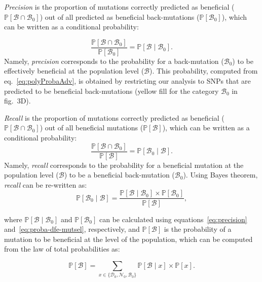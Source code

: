 \documentclass[12pt]{article}
\newcommand{\proba}{\mathbb{P}}
\newcommand{\SphyDel}{\mathcal{D}_0}
\newcommand{\SphyNeu}{\mathcal{N}_0}
\newcommand{\SphyBen}{\mathcal{B}_0}
\newcommand{\Sphyclass}{x}
\newcommand{\given}{\mid}
\newcommand{\SpopBen}{\mathcal{B}}
\newcommand{\ProbaPopBen}{\proba [ \SpopBen ]}
\begin{document}
    \textit{Precision} is the proportion of mutations correctly predicted as beneficial ($\proba [ \SpopBen \cap  \SphyBen]$) out of all predicted as beneficial back-mutations ($\proba [ \SphyBen]$), which can be written as a conditional probability:

    \begin{equation}
        \frac{\proba [ \SpopBen  \cap  \SphyBen]}{\proba [ \SphyBen]} = \proba [ \SpopBen  \given  \SphyBen].
        \label{eq:precision}
    \end{equation}
    Namely, \textit{precision} corresponds to the probability for a back-mutation ($\SphyBen$) to be effectively beneficial at the population level ($\SpopBen$).
    This probability, computed from eq.~\ref{eq:polyProbaAdv}, is obtained by restricting our analysis to SNPs that are predicted to be beneficial back-mutations (yellow fill for the category $\SphyBen$ in fig.~3D).

    \textit{Recall} is the proportion of mutations correctly predicted as beneficial ($\proba [ \SpopBen \cap  \SphyBen]$) out of all beneficial mutations ($\proba [ \SpopBen]$), which can be written as a conditional probability:
    \begin{equation}
        \frac{\proba [ \SpopBen \cap  \SphyBen]}{\proba [ \SpopBen]} = \proba [ \SphyBen  \given \SpopBen ].
    \end{equation}
    Namely, \textit{recall} corresponds to the probability for a beneficial mutation at the population level ($\SpopBen$) to be a beneficial back-mutation ($\SphyBen$).
    Using Bayes theorem, \textit{recall} can be re-written as:
    \begin{equation}
        \proba [\SphyBen \given \SpopBen] = \frac{\proba [\SpopBen \given \SphyBen] \times \proba[\SphyBen]}{\ProbaPopBen},
        \label{eq:bayes}
    \end{equation}

    where $\proba [\SpopBen \given \SphyBen]$ and $\proba [ \SphyBen ]$ can be calculated using equations~\ref{eq:precision} and~\ref{eq:proba-dfe-mutsel}, respectively, and $\proba [ \SpopBen ]$ is the probability of a mutation to be beneficial at the level of the population, which can be computed from the law of total probabilities as:

    \begin{equation}
        \proba [ \SpopBen ] = \sum_{\Sphyclass \in \{\SphyDel, \SphyNeu, \SphyBen \} }\proba [\SpopBen \given \Sphyclass ] \times \proba [\Sphyclass ].
        \label{eq:total_proba}
    \end{equation}
\end{document}
